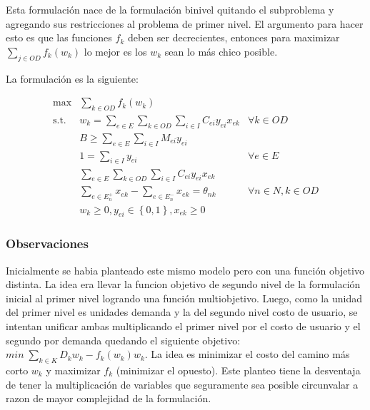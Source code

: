 \documentclass{article}
\begin{document}
  Esta formulación nace de la formulación binivel quitando el subproblema y agregando sus restricciones al problema de primer nivel. El argumento para hacer esto es que las funciones $f_k$ deben ser decrecientes, entonces para maximizar $\sum_{j \in OD}f_k(w_k)$ lo mejor es los $w_k$ sean lo más chico posible.

  La formulación es la siguiente:

  \begin{align}
    \text{max}    & \sum_{k \in OD} f_k(w_k)                                                         & \label{eq:objectivealt} \\
    \text{s.t.}\; & w_k = \sum_{e \in E} \sum_{k \in OD} \sum_{i \in I} C_{ei}y_{ei}x_{ek}           & \forall k \in OD \label{eq:shortestpathalt} \\
                  & B \geq \sum_{e \in E} \sum_{i \in I} M_{ei}y_{ei}                                & \label{eq:respectbudgetalt} \\
                  & 1 = \sum_{i \in I} y_{ei}                                                        & \forall e \in E \label{eq:alwaysoneyalt} \\
                  & \sum_{e \in E} \sum_{k \in OD} \sum_{i \in I} C_{ei}y_{ei}x_{ek}                 & \label{eq:subproblemalt} \\
                  & \sum_{e \in E_n^+} x_{ek} - \sum_{e \in E_n^-} x_{ek} = \theta_{nk}              & \forall n \in N, k \in OD \label {eq:flowbalance} \\
                  & w_k \geq 0, y_{ei} \in \left\{ 0, 1 \right\}, x_{ek} \geq 0                      & \nonumber
  \end{align}

  \subsubsection*{Observaciones}

  Inicialmente se habia planteado este mismo modelo pero con una función objetivo distinta. La idea era llevar la funcion objetivo de segundo nivel de la formulación inicial al primer nivel logrando una función multiobjetivo. Luego, como la unidad del primer nivel es unidades demanda y la del segundo nivel costo de usuario, se intentan unificar ambas multiplicando el primer nivel por el costo de usuario y el segundo por demanda quedando el siguiente objetivo: $min\;\sum_{k \in K} D_kw_k - f_k(w_k)w_k$. La idea es minimizar el costo del camino más corto $w_k$ y maximizar $f_k$ (minimizar el opuesto). Este planteo tiene la desventaja de tener la multiplicación de variables que seguramente sea posible circunvalar a razon de mayor complejidad de la formulación.
\end{document}
